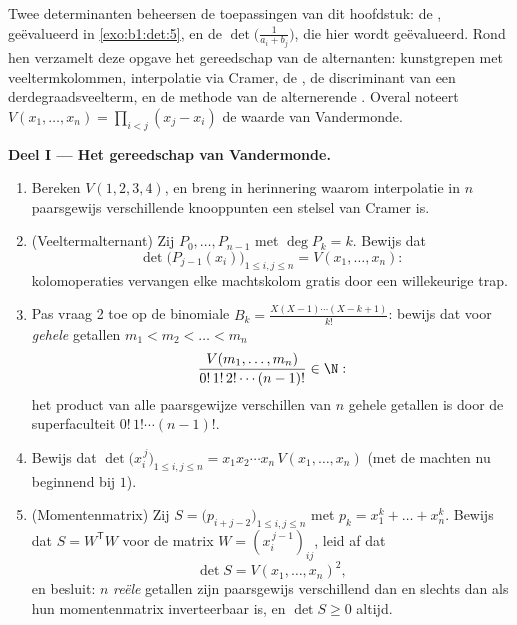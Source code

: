 \begin{problem}\label{pb:b1:det:1}
Twee determinanten beheersen de toepassingen van dit hoofdstuk: de
, geëvalueerd in \cref{exo:b1:det:5}, en de
\emph{} $\det\bigl(\frac{1}{a_i + b_j}\bigr)$,
die hier wordt geëvalueerd. Rond hen verzamelt deze opgave het
gereedschap van de alternanten: kunstgrepen met veeltermkolommen,
interpolatie via Cramer, de , de discriminant van een
derdegraadsveelterm, en de methode van de alternerende .
Overal noteert $V(x_1, \dots, x_n) = \prod_{i < j}(x_j - x_i)$ de
waarde van Vandermonde.

\medskip
\noindent\textbf{Deel I --- Het gereedschap van Vandermonde.}
\begin{enumerate}
  \item Bereken $V(1, 2, 3, 4)$, en breng in herinnering waarom
        interpolatie in $n$ paarsgewijs verschillende knooppunten
        een stelsel van Cramer is.
  \item (Veeltermalternant) Zij $P_0, \dots, P_{n-1}$
        \emph{} met $\deg P_k = k$. Bewijs dat
        \[
        \det\bigl(P_{j-1}(x_i)\bigr)_{1 \leq i, j \leq n}
        = V(x_1, \dots, x_n) :
        \]
        kolomoperaties vervangen elke machtskolom gratis door een
        willekeurige  trap.
  \item Pas vraag 2 toe op de binomiale  $B_k =
        \frac{X(X-1)\cdots(X-k+1)}{k!}$: bewijs dat voor
        \emph{gehele} getallen $m_1 < m_2 < \dots < m_n$
        \[
        \frac{V(m_1, \dots, m_n)}{0!\,1!\,2!\cdots(n-1)!}
        \in \N :
        \]
        het product van alle paarsgewijze verschillen van $n$
        gehele getallen is  door de superfaculteit
        $0!\,1!\cdots(n-1)!$.
  \item Bewijs dat $\det\bigl(x_i^{\,j}\bigr)_{1 \leq i, j \leq n}
        = x_1 x_2 \cdots x_n\, V(x_1, \dots, x_n)$ (met de machten
        nu beginnend bij $1$).
  \item (Momentenmatrix) Zij $S = \bigl(p_{i+j-2}\bigr)_{1 \leq i,
        j \leq n}$ met $p_k = x_1^k + \dots + x_n^k$. Bewijs dat $S
        = W^{\mathsf T} W$ voor de matrix $W = (x_i^{\,j-1})_{ij}$,
        leid af dat
        \[
        \det S = V(x_1, \dots, x_n)^2 ,
        \]
        en besluit: $n$ \emph{reële} getallen zijn paarsgewijs
        verschillend dan en slechts dan als hun momentenmatrix
        inverteerbaar is, en $\det S \geq 0$ altijd.
\end{enumerate}


\end{problem}
